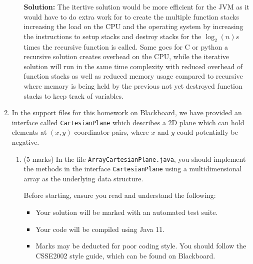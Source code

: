 \documentclass[a4,13pt]{extarticle}
\newenvironment{Solution}{\color{blue}\textbf{Solution:}}{}
\begin{document}
\begin{enumerate}
\begin{enumerate}
	        \begin{Solution}
	        The itertive solution would be more efficient for the JVM as it would have to do extra work for to create the multiple function stacks increasing the load on the CPU and the operating system by increasing the instructions to setup stacks and destroy stacks for the $\log_2(n)s$ times the recursive function is called. Same goes for C or python a recursive solution creates overhead on the CPU, while the iterative solution will run in the same time complexity with reduced overhead of function stacks as well as reduced memory usage compared to recursive where memory is being held by the previous not yet destroyed function stacks to keep track of variables.
	      	\end{Solution}
	      \end{enumerate}
	      	              
	      \newpage 
	      	          
	\item
	      In the support files for this homework on Blackboard, we have provided an interface called \texttt{CartesianPlane} which describes a 2D plane which can hold elements at $(x,y)$ coordinator pairs, where $x$ and $y$ could potentially be negative. 
	      \begin{enumerate}
	      	\item (5 marks) In the file \texttt{ArrayCartesianPlane.java}, you should implement the methods in the interface \texttt{CartesianPlane} using a multidimensional array as the underlying data structure.
	      	      	      	                      
	      	      Before starting, ensure you read and understand the following:
	      	      \begin{itemize}
	      	      		      	      	
	      	      	\item Your solution will be marked with an automated test suite. 
	      	      	      	      	      	                          
	      	      	\item Your code will be compiled using Java 11.
	      	      	      	      	      	                          
	      	      	\item Marks may be deducted for poor coding style. You should follow the CSSE2002 style guide, which can be found on Blackboard.
	      	      	      	      	      	                          

\end{itemize}
\end{enumerate}
\end{enumerate}
\end{document}
